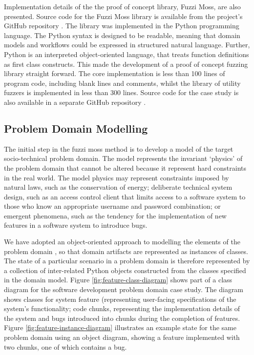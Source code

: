 \documentclass{sig-alternate}
\begin{document}
Implementation details of the the proof of concept library, Fuzzi Moss, are
also presented.  Source code for the Fuzzi Moss library is available from the
project's GitHub repository \citep{wallis2016fuzzi-moss-scm}.  The library was
implemented in the Python programming language.  The Python syntax is designed
to be readable, meaning that domain models and workflows could be expressed in
structured natural language.  Further, Python is an interpreted object-oriented
language, that treats function definitions as first class constructs.  This made
the development of a proof of concept fuzzing library straight forward.  The
core implementation is less than 100 lines of program code, including blank
lines and comments, whilst the library of utility fuzzers is implemented in less
than 300 lines. Source code for the case study is also available in a separate
GitHub repository \citep{storer2016softdev-workflow-scm}.


\subsection{Problem Domain Modelling}


The initial step in the fuzzi moss method is to develop a model of the target
socio-technical problem domain.  The model represents the invariant `physics' of
the problem domain that cannot be altered because it represent hard constraints
in the real world.  The model physics may represent constraints imposed by
natural laws, such as the conservation of energy; deliberate technical system
design, such as an access control client that limits access to a software system
to those who know an appropriate username and password combination; or emergent
phenomena, such as the tendency for the implementation of new features in a
software system to introduce bugs.

We have adopted an object-oriented approach to modelling the elements of the
problem domain \citep{bennett06object}, so that domain artifacts are represented
as instances of classes.  The state of a particular scenario in a problem domain
is therefore represented by a collection of inter-related Python objects
constructed from the classes specified in the domain model.  Figure
\ref{fig:feature-class-diagram} shows part of a class diagram for the software
development problem domain case study.  The diagram shows classes for system
feature (representing user-facing specifications of the system's functionality;
code chunks, representing the implementation details of the system and bugs
introduced into chunks during the completion of features.  Figure
\ref{fig:feature-instance-diagram} illustrates an example state for the same
problem domain using an object diagram, showing a feature implemented with two
chunks, one of which contains a bug.
\end{document}
